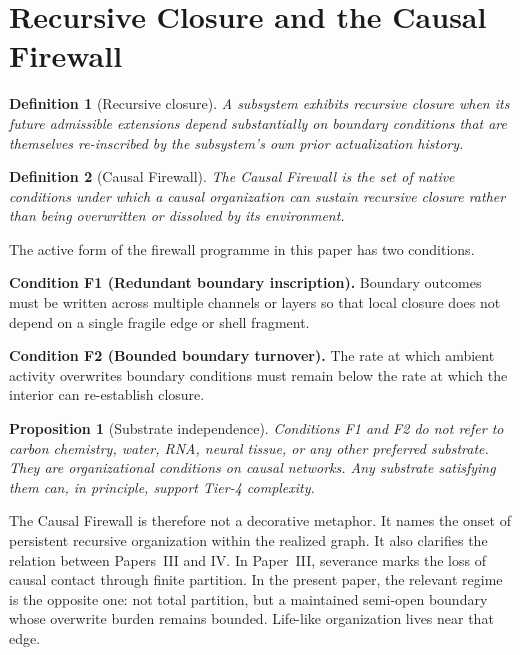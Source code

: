 \documentclass[11pt]{article}
\newtheorem{definition}{Definition}
\newtheorem{proposition}{Proposition}
\begin{document}
\section{Recursive Closure and the Causal Firewall}
\label{sec:firewall}

\begin{definition}[Recursive closure]
A subsystem exhibits \emph{recursive closure} when its future admissible extensions depend substantially on boundary conditions that are themselves re-inscribed by the subsystem's own prior actualization history.
\end{definition}

\begin{definition}[Causal Firewall]
The \emph{Causal Firewall} is the set of native conditions under which a causal organization can sustain recursive closure rather than being overwritten or dissolved by its environment.
\end{definition}

The active form of the firewall programme in this paper has two conditions.

\textbf{Condition F1 (Redundant boundary inscription).} Boundary outcomes must be written across multiple channels or layers so that local closure does not depend on a single fragile edge or shell fragment.

\textbf{Condition F2 (Bounded boundary turnover).} The rate at which ambient activity overwrites boundary conditions must remain below the rate at which the interior can re-establish closure.

\begin{proposition}[Substrate independence]
Conditions F1 and F2 do not refer to carbon chemistry, water, RNA, neural tissue, or any other preferred substrate. They are organizational conditions on causal networks. Any substrate satisfying them can, in principle, support Tier-4 complexity.
\end{proposition}

The Causal Firewall is therefore not a decorative metaphor. It names the onset of persistent recursive organization within the realized graph. It also clarifies the relation between Papers~III and IV. In Paper~III, severance marks the loss of causal contact through finite partition. In the present paper, the relevant regime is the opposite one: not total partition, but a maintained semi-open boundary whose overwrite burden remains bounded. Life-like organization lives near that edge.
\end{document}
